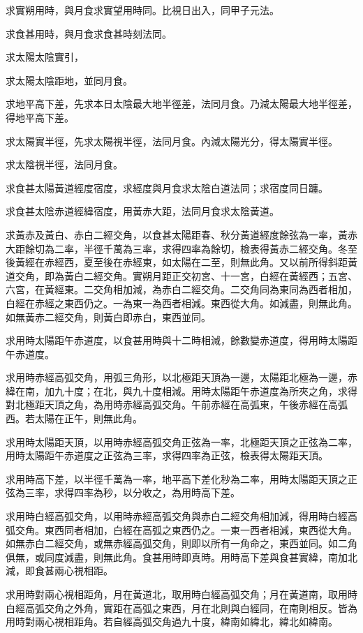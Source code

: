 \begin{pinyinscope}
求實朔用時，與月食求實望用時同。比視日出入，同甲子元法。

求食甚用時，與月食求食甚時刻法同。

求太陽太陰實引，

求太陽太陰距地，並同月食。

求地平高下差，先求本日太陰最大地半徑差，法同月食。乃減太陽最大地半徑差，得地平高下差。

求太陽實半徑，先求太陽視半徑，法同月食。內減太陽光分，得太陽實半徑。

求太陰視半徑，法同月食。

求食甚太陽黃道經度宿度，求經度與月食求太陰白道法同；求宿度同日躔。

求食甚太陰赤道經緯宿度，用黃赤大距，法同月食求太陰黃道。

求黃赤及黃白、赤白二經交角，以食甚太陽距春、秋分黃道經度餘弦為一率，黃赤大距餘切為二率，半徑千萬為三率，求得四率為餘切，檢表得黃赤二經交角。冬至後黃經在赤經西，夏至後在赤經東，如太陽在二至，則無此角。又以前所得斜距黃道交角，即為黃白二經交角。實朔月距正交初宮、十一宮，白經在黃經西；五宮、六宮，在黃經東。二交角相加減，為赤白二經交角。二交角同為東同為西者相加，白經在赤經之東西仍之。一為東一為西者相減。東西從大角。如減盡，則無此角。如無黃赤二經交角，則黃白即赤白，東西並同。

求用時太陽距午赤道度，以食甚用時與十二時相減，餘數變赤道度，得用時太陽距午赤道度。

求用時赤經高弧交角，用弧三角形，以北極距天頂為一邊，太陽距北極為一邊，赤緯在南，加九十度；在北，與九十度相減。用時太陽距午赤道度為所夾之角，求得對北極距天頂之角，為用時赤經高弧交角。午前赤經在高弧東，午後赤經在高弧西。若太陽在正午，則無此角。

求用時太陽距天頂，以用時赤經高弧交角正弦為一率，北極距天頂之正弦為二率，用時太陽距午赤道度之正弦為三率，求得四率為正弦，檢表得太陽距天頂。

求用時高下差，以半徑千萬為一率，地平高下差化秒為二率，用時太陽距天頂之正弦為三率，求得四率為秒，以分收之，為用時高下差。

求用時白經高弧交角，以用時赤經高弧交角與赤白二經交角相加減，得用時白經高弧交角。東西同者相加，白經在高弧之東西仍之。一東一西者相減，東西從大角。如無赤白二經交角，或無赤經高弧交角，則即以所有一角命之，東西並同。如二角俱無，或同度減盡，則無此角。食甚用時即真時。用時高下差與食甚實緯，南加北減，即食甚兩心視相距。

求用時對兩心視相距角，月在黃道北，取用時白經高弧交角；月在黃道南，取用時白經高弧交角之外角，實距在高弧之東西，月在北則與白經同，在南則相反。皆為用時對兩心視相距角。若自經高弧交角過九十度，緯南如緯北，緯北如緯南。


\end{pinyinscope}
